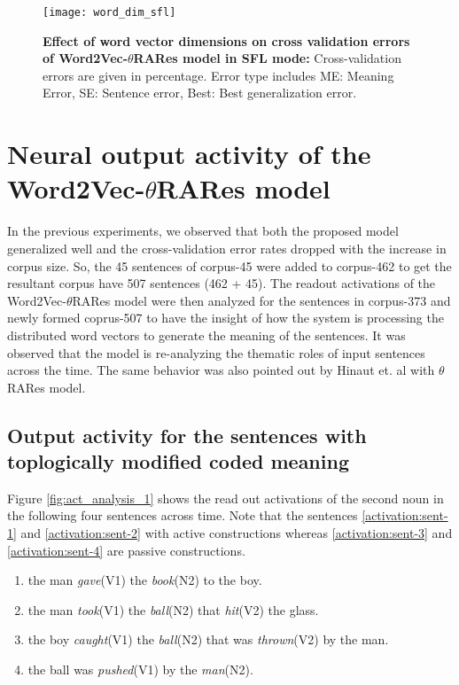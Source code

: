 \begin{figure}[hbtp]
\centering
\texttt{[image: word\_dim\_sfl]}
\caption[Effect of word vector dimensions on Word2Vec-$\theta$RARes model]{\textbf{Effect of word vector dimensions on cross validation errors of Word2Vec-$\theta$RARes model in SFL mode:} Cross-validation errors are given in percentage. Error type includes ME: Meaning Error, SE: Sentence error, Best: Best generalization error.}
\label{fig:word_dim_sfl}
\end{figure}


\section{Neural output activity of the Word2Vec-$\theta$RARes model}

In the previous experiments, we observed that both the proposed model generalized well and the cross-validation error rates dropped with the increase in corpus size. So, the 45 sentences of corpus-45 were added to corpus-462 to get the resultant corpus have 507 sentences (462 + 45). The readout activations of the Word2Vec-$\theta$RARes model were then analyzed for the sentences in corpus-373 and newly formed coprus-507 to have the insight of how the system is processing the distributed word vectors to generate the meaning of the sentences. It was observed that the model is re-analyzing the thematic roles of input sentences across the time. The same behavior was also pointed out by Hinaut et. al \cite{tra:xavier_hri, xavier:2013:RT} with $\theta$RARes model.

\subsection{Output activity for the sentences with toplogically modified coded meaning}

Figure \ref{fig:act_analysis_1} shows the read out activations of the second noun in the following four sentences across time. Note that the sentences \ref{activation:sent-1} and \ref{activation:sent-2} with active constructions whereas \ref{activation:sent-3} and \ref{activation:sent-4} are passive constructions.

\begin{enumerate}[noitemsep]
\item the man \textit{gave}(V1) the \textit{book}(N2) to the boy. \label{activation:sent-1}
\item the man \textit{took}(V1) the \textit{ball}(N2) that \textit{hit}(V2) the glass. \label{activation:sent-2}
\item the boy \textit{caught}(V1) the \textit{ball}(N2) that was \textit{thrown}(V2) by the man.  \label{activation:sent-3} 
\item the ball was \textit{pushed}(V1) by the \textit{man}(N2).  \label{activation:sent-4}
\end{enumerate}

